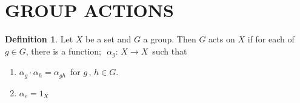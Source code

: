\documentclass[11pt,a4paper]{article}
\theoremstyle{definition}
\newtheorem{defn}[thm]{Definition}
\begin{document}
\section{GROUP ACTIONS}


\begin{defn}
Let $X$ be a set and $G$ a group. Then $G$ acts on $X$ if for each of $g\in G$, there is a function; $\,\, \alpha_g :\, X\longrightarrow X\,$ such that 
\begin{enumerate}
\item[(i)] $\alpha_g \cdot \alpha_h = \alpha_{gh}\,$ for $g\,,\, h\in G$.
\item[(ii)] $\alpha_e = 1_X$\\\\
\end{enumerate}
\end{defn}
\end{document}
